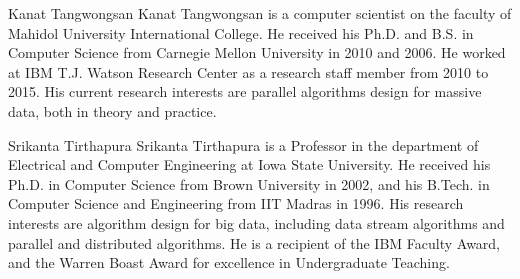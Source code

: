 \documentclass[10pt,journal,compsoc]{IEEEtran}
\begin{document}
\begin{IEEEbiography}{Kanat Tangwongsan}
Kanat Tangwongsan is a computer scientist on the faculty of Mahidol University International College. He received his Ph.D. and B.S. in Computer Science from Carnegie Mellon University in 2010 and 2006. He worked at IBM T.J. Watson Research Center as a research staff member from 2010 to 2015. His current research interests are parallel algorithms design for massive data, both in theory and practice.
\end{IEEEbiography}


\begin{IEEEbiography}{Srikanta Tirthapura}
Srikanta Tirthapura is a Professor in the department of Electrical and Computer Engineering at Iowa State University. He received his Ph.D. in Computer Science from Brown University in 2002, and his B.Tech. in Computer Science and Engineering from IIT Madras in 1996. His research interests are algorithm design for big data, including data stream algorithms and parallel and distributed algorithms. He is a recipient of the IBM Faculty Award, and the Warren Boast Award for excellence in Undergraduate Teaching.
\end{IEEEbiography}
\end{document}
